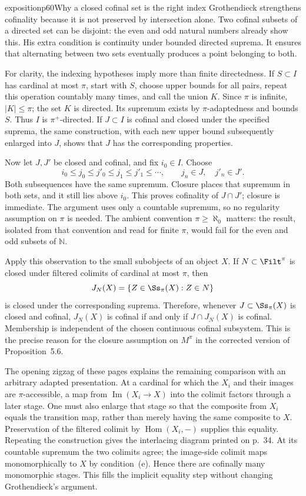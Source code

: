 \begin{dcomment}{exposition}{p60}{Why a closed cofinal set is the right index}
Grothendieck strengthens cofinality because it is not preserved by intersection alone. Two cofinal subsets of a directed set can be disjoint: the even and odd natural numbers already show this. His extra condition is continuity under bounded directed suprema. It ensures that alternating between two sets eventually produces a point belonging to both.

For clarity, the indexing hypotheses imply more than finite directedness. If $S\subset I$ has cardinal at most $\pi$, start with $S$, choose upper bounds for all pairs, repeat this operation countably many times, and call the union $K$. Since $\pi$ is infinite, $|K|\leq\pi$; the set $K$ is directed. Its supremum exists by $\pi$-adaptedness and bounds $S$. Thus $I$ is $\pi^+$-directed. If $J\subset I$ is cofinal and closed under the specified suprema, the same construction, with each new upper bound subsequently enlarged into $J$, shows that $J$ has the corresponding properties.

Now let $J,J'$ be closed and cofinal, and fix $i_0\in I$. Choose
\[
 i_0\leq j_0\leq j'_0\leq j_1\leq j'_1\leq\cdots,
 \qquad j_n\in J,\quad j'_n\in J'.
\]
Both subsequences have the same supremum. Closure places that supremum in both sets, and it still lies above $i_0$. This proves cofinality of $J\cap J'$; closure is immediate. The argument uses only a countable supremum, so no regularity assumption on $\pi$ is needed. The ambient convention $\pi\geq\aleph_0$ matters: the result, isolated from that convention and read for finite $\pi$, would fail for the even and odd subsets of $\mathbb N$.

Apply this observation to the small subobjects of an object $X$. If $N\subset\Filt^\pi$ is closed under filtered colimits of cardinal at most $\pi$, then
\[
 J_N(X)=\{Z\in\Ss_\pi(X):Z\in N\}
\]
is closed under the corresponding suprema. Therefore, whenever $J\subset\Ss_\pi(X)$ is closed and cofinal, $J_N(X)$ is cofinal if and only if $J\cap J_N(X)$ is cofinal. Membership is independent of the chosen continuous cofinal subsystem. This is the precise reason for the closure assumption on $M^\pi$ in the corrected version of Proposition~5.6.

The opening zigzag of these pages explains the remaining comparison with an arbitrary adapted presentation. At a cardinal for which the $X_i$ and their images are $\pi$-accessible, a map from $\operatorname{Im}(X_i\to X)$ into the colimit factors through a later stage. One must also enlarge that stage so that the composite from $X_i$ equals the transition map, rather than merely having the same composite to $X$. Preservation of the filtered colimit by $\operatorname{Hom}(X_i,-)$ supplies this equality. Repeating the construction gives the interlacing diagram printed on p.~34. At its countable supremum the two colimits agree; the image-side colimit maps monomorphically to $X$ by condition~(e). Hence there are cofinally many monomorphic stages. This fills the implicit equality step without changing Grothendieck's argument.
\end{dcomment}

